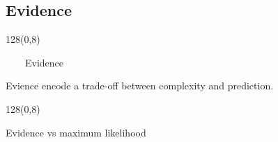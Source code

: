 \documentclass[shownotes]{beamer}
\begin{document}
\subsection{Evidence}


\begin{frame}
\begin{textblock}{128}(0,8)
\begin{center}
 \large \ \ \ \  Evidence 
\end{center}
\end{textblock}
\vspace{1cm}
 
 
 \pause

 \begin{mdframed}[backgroundcolor=black!15]
\centering
Evience encode a trade-off between complexity and prediction.
\end{mdframed}
 
\end{frame}


\begin{frame}
\begin{textblock}{128}(0,8)
\begin{center}
 \large Evidence vs maximum likelihood
\end{center}
\end{textblock}
\vspace{0.75cm}



\end{frame}
\end{document}
